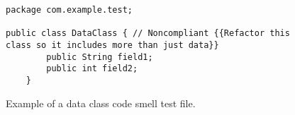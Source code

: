 \begin{figure} [htb]
    \begin{lstlisting}
package com.example.test;

public class DataClass { // Noncompliant {{Refactor this class so it includes more than just data}}
        public String field1;
        public int field2;
    }
    \end{lstlisting}
    \caption{Example of a data class code smell test file.}
    \label{data_class_example}
\end{figure}


